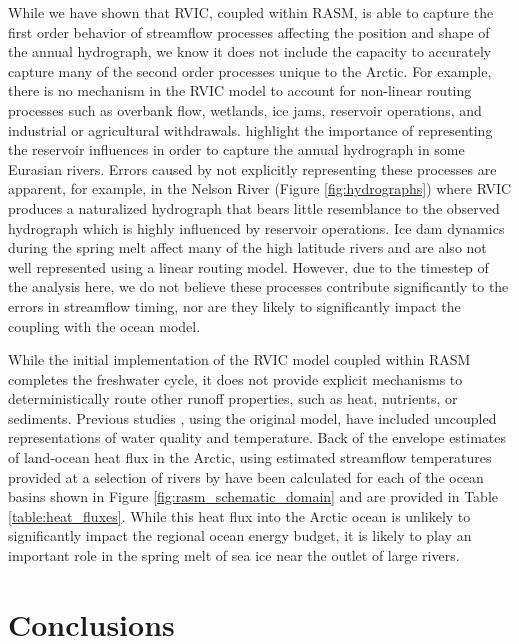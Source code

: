\documentclass[jgrga, draft]{agutex}
\begin{document}
\begin{article}
While we have shown that RVIC, coupled within RASM, is able to capture the first order behavior of streamflow processes affecting the position and shape of the annual hydrograph, we know it does not include the capacity to accurately capture many of the second order processes unique to the Arctic.
For example, there is no mechanism in the RVIC model to account for non-linear routing processes such as overbank flow, wetlands, ice jams, reservoir operations, and industrial or agricultural withdrawals.
\citet{Adam_2007} highlight the importance of representing the reservoir influences in order to capture the annual hydrograph in some Eurasian rivers.
Errors caused by not explicitly representing these processes are apparent, for example, in the Nelson River (Figure \ref{fig:hydrographs}) where RVIC produces a naturalized hydrograph that bears little resemblance to the observed hydrograph which is highly influenced by reservoir operations.
Ice dam dynamics during the spring melt affect many of the high latitude rivers and are also not well represented using a linear routing model.
However, due to the timestep of the analysis here, we do not believe these processes contribute significantly to the errors in streamflow timing, nor are they likely to significantly impact the coupling with the ocean model.

While the initial implementation of the RVIC model coupled within RASM completes the freshwater cycle, it does not provide explicit mechanisms to deterministically route other runoff properties, such as heat, nutrients, or sediments.
Previous studies \citep[e.g.][]{vanVliet_2011,vanVliet_2012}, using the original \citet{Lohmann_1996} model, have included uncoupled representations of water quality and temperature.
Back of the envelope estimates of land-ocean heat flux in the Arctic, using estimated streamflow temperatures provided at a selection of rivers by \citet{Lammers_2007} have been calculated for each of the ocean basins shown in Figure \ref{fig:rasm_schematic_domain} and are provided in Table \ref{table:heat_fluxes}.
While this heat flux into the Arctic ocean is unlikely to significantly impact the regional ocean energy budget, it is likely to play an important role in the spring melt of sea ice near the outlet of large rivers.

\section{Conclusions}
\label{sec:conclusions}


\end{article}
\end{document}
